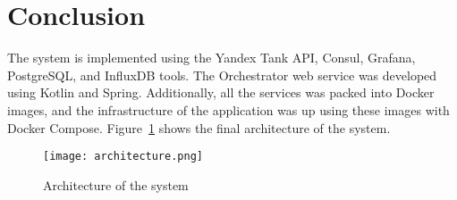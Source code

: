 \section{Conclusion}\label{sec:conclusion}
The system is implemented using the Yandex Tank API, Consul, Grafana, PostgreSQL, and InfluxDB tools. The Orchestrator web service was developed using Kotlin and Spring. Additionally, all the services was packed into Docker images, and the infrastructure of the application was up using these images with Docker Compose.
Figure~\ref{fig:architecture} shows the final architecture of the system.

\begin{figure}[t]
    \centering
    \texttt{[image: architecture.png]}
    \caption{Architecture of the system}
    \label{fig:architecture}
\end{figure}